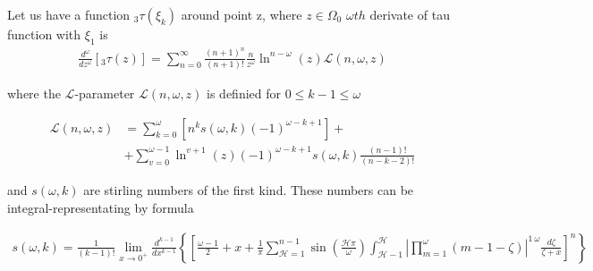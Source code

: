 \begin{theorem}
      Let us have a function \(_3\tau(\xi_k)\) 
      around point z, where \(z \in \Omega_0\)
      \(\omega th\) derivate of tau function with \(\xi_1\) is
      \begin{align}
            \frac{d^\omega}{dz^{\omega}}[_3\tau(z)] = 
            \sum_{n=0}^{\infty} \frac{(n+1)^n}{(n+1)!}
            \frac{n}{z^{\omega}}\ln^{n-\omega}(z) \mathcal{L}(n, \omega, z)
      \end{align}
      
      where the \( \mathcal{L}\)-parameter \( \mathcal{L}(n, \omega,
      z)\) is definied for \(0 \leq k-1 \leq \omega\)
      
      \begin{align}
            \mathcal{L}(n, \omega, z) &= \sum_{k=0}^{\omega}\left[ 
            n^k s(\omega, k) (-1)^{\omega-k+1}\right] + \\ &+ 
            \sum_{v=0}^{\omega-1}\ln^{v+1}(z) (-1)^{\omega-k+1}s(
            \omega, k) \frac{(n-1)!}{(n-k-2)!}
      \end{align}
      
            and \(s(\omega, k)\) are stirling numbers 
            of the first kind. These numbers can be 
            integral-representating by formula
            
      \begin{align}
            s(\omega, k) = \frac{1}{(k-1)!}\lim_{x \to 0^+}  
            \frac{d^{k-1}}{dx^{k-1}}\left\{\left[ \frac{\omega-1}{2} 
            + x + \frac{1}{\pi} \sum_{\mathcal{H}=1}^{n-1}\sin\left(
            \frac{\mathcal{H}\pi}{\omega}\right)\int_{\mathcal{H}-1}^{\mathcal{H}}
            \left| \prod_{m=1}^\omega (m-1-\zeta)\right|^{1\ \omega} \frac{d\zeta}{\zeta+x}
            \right]^n \right\}
      \end{align}
\end{theorem}

